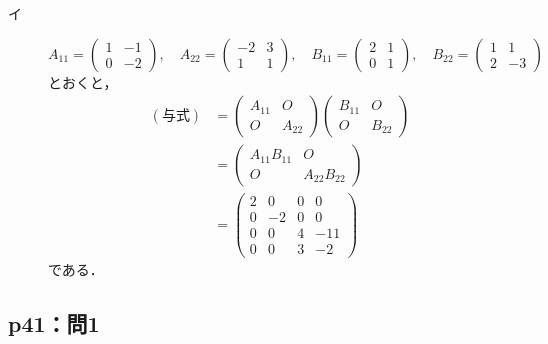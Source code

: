 \documentclass[uplatex,dvipdfmx,a4paper,10pt,fleqn]{jsarticle}
\begin{document}
\begin{tleftbar}
    \begin{description}
        \item[イ] 
        \[
            A_{11} = \begin{pmatrix} 1 & -1 \\ 0 & -2 \end{pmatrix},\quad A_{22} = \begin{pmatrix} -2 & 3 \\ 1 & 1 \end{pmatrix} ,\quad B_{11} = \begin{pmatrix} 2 & 1 \\ 0 & 1\end{pmatrix} ,\quad B_{22}= \begin{pmatrix} 1 & 1 \\ 2 & -3 \end{pmatrix}
        \]
        とおくと，
        \begin{align*} 
            (\text{与式})&= \begin{pmatrix} A_{11} & O \\ O & A_{22} \end{pmatrix} \begin{pmatrix} B_{11} & O \\ O & B_{22} \end{pmatrix} \\
            & = \begin{pmatrix} A_{11} B_{11} & O \\ O & A_{22} B_{22} \end{pmatrix} \\
            & = \begin{pmatrix} 2 & 0 & 0 & 0 \\ 0 & -2 & 0 & 0 \\ 0 & 0 & 4 & -11 \\ 0 & 0 & 3 & -2 \end{pmatrix}
        \end{align*}
        である．
    \end{description}
\end{tleftbar}

\subsection*{p41：問1}
%
\end{document}
